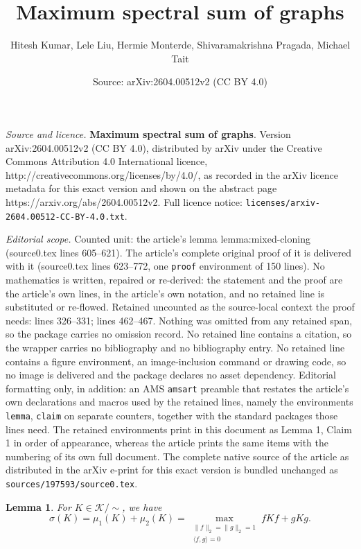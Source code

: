 \documentclass[10pt,a4paper]{amsart}
\title{\textbf{Maximum spectral sum of graphs}}
\author{Hitesh Kumar, Lele Liu, Hermie Monterde, Shivaramakrishna Pragada, Michael Tait}
\date{Source: arXiv:2604.00512v2 (CC BY 4.0)}
\newtheorem{lemma}{Lemma}
\begin{document}
\maketitle

\noindent\emph{Source and licence.} \textbf{Maximum spectral sum of graphs}. Version arXiv:2604.00512v2 (CC BY 4.0), distributed by arXiv under the Creative Commons Attribution 4.0 International licence, http://creativecommons.org/licenses/by/4.0/, as recorded in the arXiv licence metadata for this exact version and shown on the abstract page https://arxiv.org/abs/2604.00512v2. Full licence notice: \texttt{licenses/arxiv-2604.00512-CC-BY-4.0.txt}.\par\smallskip

\noindent\textit{Editorial scope.} Counted unit: the article's lemma lemma:mixed-cloning (source0.tex lines 605--621). The article's complete original proof of it is delivered with it (source0.tex lines 623--772, one \texttt{proof} environment of 150 lines). No mathematics is written, repaired or re-derived: the statement and the proof are the article's own lines, in the article's own notation, and no retained line is substituted or re-flowed.  Retained uncounted as the source-local context the proof needs: lines 326--331; lines 462--467.  Nothing was omitted from any retained span, so the package carries no omission record.  No retained line contains a citation, so the wrapper carries no bibliography and no bibliography entry.  No retained line contains a figure environment, an image-inclusion command or drawing code, so no image is delivered and the package declares no asset dependency.  Editorial formatting only, in addition: an AMS \texttt{amsart} preamble that restates the article's own declarations and macros used by the retained lines, namely the environments \texttt{lemma}, \texttt{claim} on separate counters, together with the standard packages those lines need.  The retained environments print in this document as Lemma 1, Claim 1 in order of appearance, whereas the article prints the same items with the numbering of its own full document.  The complete native source of the article as distributed in the arXiv e-print for this exact version is bundled unchanged as \texttt{sources/197593/source0.tex}.
\begin{lemma}\label{lemma:spectral_sum_graphon} 
For $K\in \mathcal{K}/\sim$, we have
\[
\sigma(K) = \mu_1(K) + \mu_2(K) = \max_{\substack{\| f\|_2=\| g\|_2 = 1\\ \langle f,g\rangle = 0}} fKf + gKg.
\]
\end{lemma}
\end{document}
